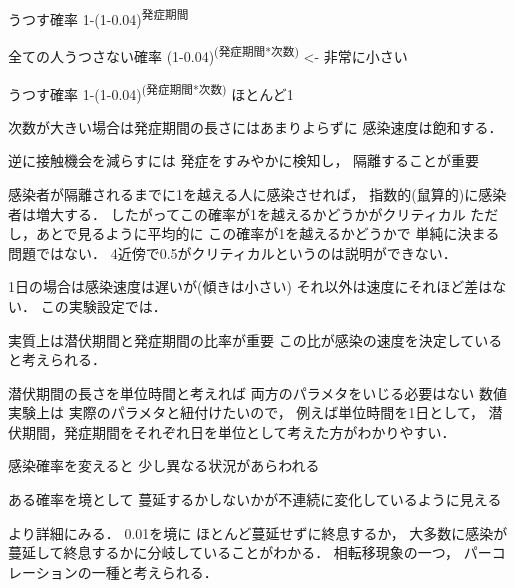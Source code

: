 \documentclass[10pt,oneside]{scrartcl}
\begin{document}
うつす確率
1-(1-0.04)\textsuperscript{発症期間}

全ての人うつさない確率
(1-0.04)\textsuperscript{(発症期間*次数)} <- 非常に小さい

うつす確率
1-(1-0.04)\textsuperscript{(発症期間*次数)} ほとんど1

次数が大きい場合は発症期間の長さにはあまりよらずに
感染速度は飽和する．

逆に接触機会を減らすには
発症をすみやかに検知し，
隔離することが重要

感染者が隔離されるまでに1を越える人に感染させれば，
指数的(鼠算的)に感染者は増大する．
したがってこの確率が1を越えるかどうかがクリティカル
ただし，あとで見るように平均的に
この確率が1を越えるかどうかで
単純に決まる問題ではない．
4近傍で0.5がクリティカルというのは説明ができない．

1日の場合は感染速度は遅いが(傾きは小さい)
それ以外は速度にそれほど差はない．
この実験設定では．

\begin{figure*}%
  \centering
\end{figure*}

実質上は潜伏期間と発症期間の比率が重要
この比が感染の速度を決定していると考えられる．

潜伏期間の長さを単位時間と考えれば
両方のパラメタをいじる必要はない
数値実験上は
実際のパラメタと紐付けたいので，
例えば単位時間を1日として，
潜伏期間，発症期間をそれぞれ日を単位として考えた方がわかりやすい．

感染確率を変えると
少し異なる状況があらわれる

ある確率を境として
蔓延するかしないかが不連続に変化しているように見える

\begin{figure*}%
  \centering
\end{figure*}

より詳細にみる．
0.01を境に
ほとんど蔓延せずに終息するか，
大多数に感染が蔓延して終息するかに分岐していることがわかる．
相転移現象の一つ，
パーコレーションの一種と考えられる．

\begin{figure*}%
  \centering
\end{figure*}
\end{document}
